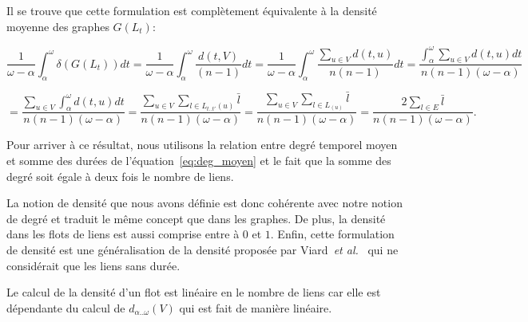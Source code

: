 Il se trouve que cette formulation est complètement équivalente à la densité moyenne des graphes $G(L_t)$:

\begin{equation*}
\dfrac{1}{\omega-\alpha} \int_{\alpha}^{\omega} \delta(G(L_t)) dt=
\dfrac{1}{\omega-\alpha} \int_{\alpha}^{\omega} \dfrac{d(t,V)}{(n-1)}dt=
 \dfrac{1}{\omega-\alpha} \int_{\alpha}^{\omega} \dfrac{\sum_{u \in V} d(t,u)}{n(n-1)}dt = 
 \dfrac{\int_{\alpha}^{\omega} \sum_{u \in V} d(t,u)dt}{n(n-1)(\omega-\alpha)} 
 \end{equation*}

 \begin{equation*}
 =
\dfrac{\sum_{u \in V} \int_{\alpha}^{\omega}d(t,u)dt}{n(n-1)(\omega-\alpha)} =
\dfrac{\sum_{u \in V} \sum_{l \in L_{t..t'}(u)} \bar{l}}{n(n-1)(\omega-\alpha)} =
\dfrac{\sum_{u \in V} \sum_{l \in L_(u)} \bar{l}}{n(n-1)(\omega-\alpha)}=
\dfrac{2\sum_{l \in E}\bar{l}}{n(n-1) (\omega-\alpha)} .
\end{equation*}

Pour arriver à ce résultat, nous utilisons la relation entre degré temporel moyen et somme des durées de l'équation~\ref{eq:deg_moyen} et le fait que la somme des degré soit égale à deux fois le nombre de liens.

La notion de densité que nous avons définie est donc cohérente avec notre notion de degré et traduit le même concept que dans les graphes.
De plus, la densité dans les flots de liens est aussi comprise entre à $0$ et $1$.
Enfin, cette formulation de densité est une généralisation de la densité proposée par Viard~\emph{et al.}~\cite{Viard2014a} qui ne considérait que les liens sans durée.

Le calcul de la densité d'un flot est linéaire en le nombre de liens car elle est dépendante du calcul de $d_{\alpha..\omega}(V)$  qui est fait de manière linéaire.
\clearpage

